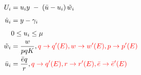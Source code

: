 \documentclass[10pt]{article}
\begin{document}
\begin{align*}
U_i &= u_i y \;-\;(\bar{u}-u_i)\,\tilde{w}_i  \\[4pt] 
 \dot{u}_i &= y - \gamma_i   \\[4pt]
& 0 \le u_i \le \mu  \\
\tilde{w}_i &=\frac{w}{pqK}, \textcolor{red}{q \rightarrow q'(E), w \rightarrow w'(E) , p \rightarrow p'(E)} \\
 \bar{u}_i &=\frac{\bar{e}q}{r},\textcolor{red}{q \rightarrow q'(E),r \rightarrow r'(E),  \bar{e} \rightarrow \bar{e}'(E)} \\ 
\end{align*}
\end{document}
